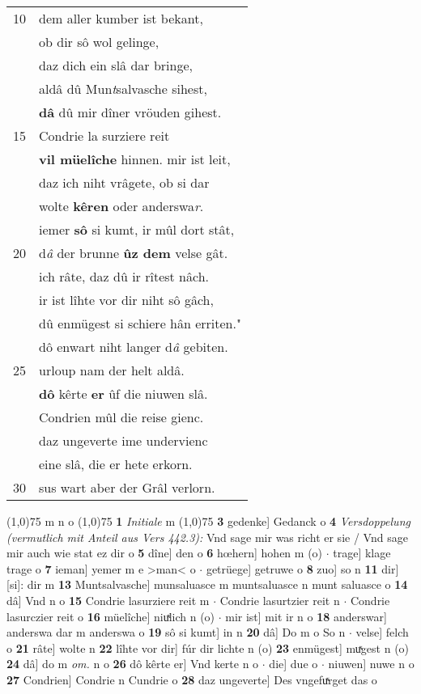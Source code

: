 \documentclass[8pt,a4paper,notitlepage]{article}
\begin{document}
\begin{table}[ht]
\begin{minipage}[t]{0.5\linewidth}
\begin{tabular}{rl}
10 & dem aller kumber ist bekant,\\ 
 & ob dir sô wol gelinge,\\ 
 & daz dich ein slâ dar bringe,\\ 
 & aldâ dû Mun\textit{t}salvasche sihest,\\ 
 & \textbf{dâ} dû mir dîner vröuden gihest.\\ 
15 & Condrie la surziere reit\\ 
 & \textbf{vil müelîche} hinnen. mir ist leit,\\ 
 & daz ich niht vrâgete, ob si dar\\ 
 & wolte \textbf{kêren} oder anderswa\textit{r}.\\ 
 & iemer \textbf{sô} si kumt, ir mûl dort stât,\\ 
20 & d\textit{â} der brunne \textbf{ûz dem} velse gât.\\ 
 & ich râte, daz dû ir rîtest nâch.\\ 
 & ir ist lîhte vor dir niht sô gâch,\\ 
 & dû enmügest si schiere hân erriten."\\ 
 & dô enwart niht langer d\textit{â} gebiten.\\ 
25 & urloup nam der helt aldâ.\\ 
 & \textbf{dô} kêrte \textbf{er} ûf die niuwen slâ.\\ 
 & Condrien mûl die reise gienc.\\ 
 & daz ungeverte ime undervienc\\ 
 & eine slâ, die er hete erkorn.\\ 
30 & sus wart aber der Grâl verlorn.\\ 
\end{tabular}
\scriptsize
\line(1,0){75} \newline
m n o \newline
\line(1,0){75} \newline
\textbf{1} \textit{Initiale} m  \newline
\line(1,0){75} \newline
\textbf{3} gedenke] Gedanck o \textbf{4} \textit{Versdoppelung (vermutlich mit Anteil aus Vers 442.3):} Vnd sage mir was richt er sie / Vnd sage mir auch wie stat ez dir o  \textbf{5} dîne] den o \textbf{6} hœhern] hohen m (o)  $\cdot$ trage] klage trage o \textbf{7} ieman] yemer m e >man< o  $\cdot$ getrüege] getruwe o \textbf{8} zuo] so n \textbf{11} dir] [si]: dir m \textbf{13} Muntsalvasche] munsaluasce m muntsaluasce n munt saluasce o \textbf{14} dâ] Vnd n o \textbf{15} Condrie lasurziere reit m  $\cdot$ Condrie lasurtzier reit n  $\cdot$ Condrie lasurczier reit o \textbf{16} müelîche] niuͯlich n (o)  $\cdot$ mir ist] mit ir n o \textbf{18} anderswar] anderswa dar m anderswa o \textbf{19} sô si kumt] in n \textbf{20} dâ] Do m o So n  $\cdot$ velse] felch o \textbf{21} râte] wolte n \textbf{22} lîhte vor dir] fúr dir lichte n (o) \textbf{23} enmügest] muͯgest n (o) \textbf{24} dâ] do m \textit{om.} n o \textbf{26} dô kêrte er] Vnd kerte n o  $\cdot$ die] due o  $\cdot$ niuwen] nuwe n o \textbf{27} Condrien] Condrie n Cundrie o \textbf{28} daz ungeverte] Des vngefuͯrget das o \newline

\end{minipage}
\end{table}
\end{document}
